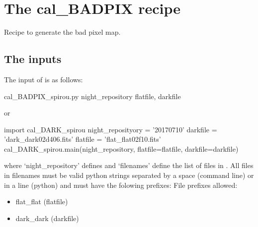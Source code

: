 \clearpage
\newpage
\section{The cal\_BADPIX recipe}
\label{ch:the_recipes:cal_BADPIX_spirou}

Recipe to generate the bad pixel map. \\

\subsection{The inputs}
The input of \calbadpix is as follows:
\begin{cmdbox}
cal_BADPIX_spirou.py  night_repository  flatfile, darkfile
\end{cmdbox}
\noindent or
\begin{pythonbox}
import cal_DARK_spirou
night_reposityory = '20170710'
darkfile = 'dark_dark02d406.fits'
flatfile = 'flat_flat02f10.fits'
cal_DARK_spirou.main(night_repository, flatfile=flatfile, darkfile=darkfile)
\end{pythonbox}

\noindent where `night\_repository' defines \argnightname and `filenames' define the list of files in \argfilenames. All files in filenames must be valid python strings separated by a space (command line) or in a line (python) and must have the folowing prefixes:
\noindent File prefixes allowed:
\begin{itemize}
	\item flat\_flat (flatfile)
	\item dark\_dark (darkfile)
\end{itemize}




